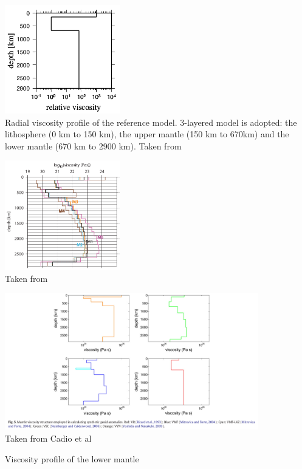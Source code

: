 

\begin{center}
\includegraphics[width=5cm]{images/viscosity_profile/yohk01}\\
{\captionfont Radial viscosity profile of the reference model. 3-layered model is adopted: 
the lithosphere (0 km to 150 km), the upper mantle (150 km to 670km) 
and the lower mantle (670 km to 2900 km). Taken from \cite{yohk01}}
\end{center}

\begin{center}
\includegraphics[width=5cm]{images/viscosity_profile/stca06}\\
{\captionfont Taken from \cite{stca06}}
\end{center}

\begin{center}
\includegraphics[width=11cm]{images/viscosity_profile/capd11}\\
{\captionfont Taken from Cadio et al \cite{capd11} }
\end{center}

\Literature Viscosity profile of the lower mantle \cite{elss85}
